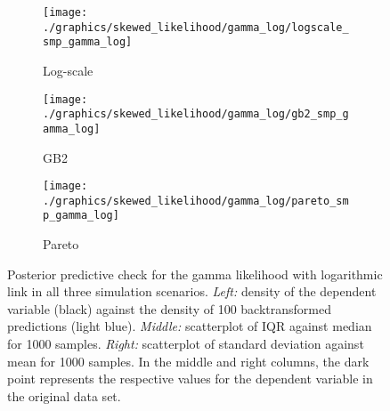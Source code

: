 \begin{figure}
    \begin{subfigure}{\textwidth}
        \texttt{[image: ./graphics/skewed\_likelihood/gamma\_log/logscale\_smp\_gamma\_log]}
        \caption{Log-scale}
    \end{subfigure}
    \newline
    \begin{subfigure}{\textwidth}
        \texttt{[image: ./graphics/skewed\_likelihood/gamma\_log/gb2\_smp\_gamma\_log]}
        \caption{GB2}
    \end{subfigure}
    \newline
    \begin{subfigure}{\textwidth}
        \texttt{[image: ./graphics/skewed\_likelihood/gamma\_log/pareto\_smp\_gamma\_log]}
        \caption{Pareto}
    \end{subfigure}
    \caption[Posterior predictive check for the gamma likelihood in all three simulation scenarios.]{Posterior predictive check for the gamma likelihood with logarithmic link in all three simulation scenarios. \textit{Left:} density of the dependent variable (black) against the  density of 100 backtransformed predictions (light blue). \textit{Middle:} scatterplot of IQR against median for 1000 samples. \textit{Right:} scatterplot of standard deviation against mean for 1000 samples. In the middle and right columns, the dark point represents the respective values for the dependent variable in the original data set.}
    \label{fig:ppc_gamma_log}
\end{figure}




